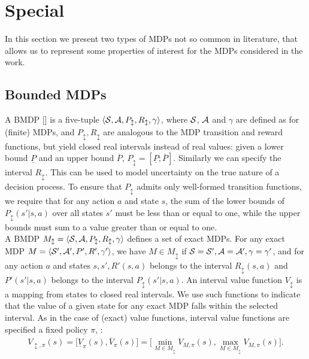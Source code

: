 \section{Special } \label{sec:specmdp}
In this section we present two types of \ac{MDPs} not so common in literature, that allows us to represent some properties of interest for the \ac{MDPs} considered in the work.

\subsection{Bounded \ac{MDPs}}
A \acf{BMDP} [\cite{givan2000bounded}] is a five-tuple $\langle \mathcal{S}, \mathcal{A}, P_{\updownarrow}, R_{\updownarrow}, \gamma \rangle$, where $\mathcal{S}$, $\mathcal{A}$ and $\gamma$ are defined as for (finite) MDPs, and $P_{\updownarrow}, R_{\updownarrow}$ are analogous to the MDP transition and reward functions, but yield closed real intervals instead of real values: given a lower bound $\underline{P}$ and an upper bound $\overline{P}$, $P_{\updownarrow} = [\underline{P}; \overline{P}]$. Similarly we can specify the interval $R_{\updownarrow}$. This can be used to model uncertainty on the true nature of a decision process. To ensure that $P_{\updownarrow}$ admits only well-formed transition functions, we require that for any action $a$ and state $s$, the sum of the lower bounds of $P_{\updownarrow}(s'|s,a)$ over all states $s'$ must be less than or equal to one, while the upper bounds must sum to a value greater than or equal to one.\\
\newline
A BMDP $M_{\updownarrow} = \langle \mathcal{S}, \mathcal{A}, P_{\updownarrow}, R_{\updownarrow}, \gamma \rangle$ defines a set of exact MDPs. For any exact MDP $M = \langle \mathcal{S}', \mathcal{A}', P', R', \gamma' \rangle$, we have $M \in M_{\updownarrow}$ if $\mathcal{S} = \mathcal{S}', \mathcal{A} = \mathcal{A}', \gamma = \gamma'$, and for any action $a$ and states $s, s', R'(s,a)$ belongs to the interval $R_{\updownarrow}(s,a)$ and $P'(s'|s,a)$ belongs to the interval $P_{\updownarrow}(s'|s,a)$. An interval value function $V_{\updownarrow}$ is a mapping from states to closed real intervals. We use such functions to indicate that the value of a given state for any exact MDP falls within the selected interval. As in the case of (exact) value functions, interval value functions are specified \wrt a fixed policy $\pi$, \ie:
\begin{align} V_{\updownarrow, \pi}(s) = \Big[ \underline{V}_{\pi}(s), \overline{V}_{\pi}(s)\Big] = \Big[ \min_{M \in M_{\updownarrow}} V_{M,\pi}(s), \max_{M \in M_{\updownarrow}} V_{M,\pi}(s)\Big]. \end{align}
